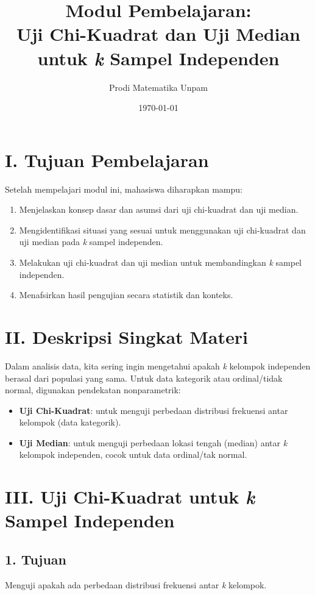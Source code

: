 \documentclass[12pt]{article}
\title{Modul Pembelajaran:\\Uji Chi-Kuadrat dan Uji Median untuk \textit{k} Sampel Independen}
\author{Prodi Matematika Unpam}
\date{\today}
\begin{document}
	
	\maketitle
	
	\section*{I. Tujuan Pembelajaran}
	Setelah mempelajari modul ini, mahasiswa diharapkan mampu:
	\begin{enumerate}
		\item Menjelaskan konsep dasar dan asumsi dari uji chi-kuadrat dan uji median.
		\item Mengidentifikasi situasi yang sesuai untuk menggunakan uji chi-kuadrat dan uji median pada \textit{k} sampel independen.
		\item Melakukan uji chi-kuadrat dan uji median untuk membandingkan \textit{k} sampel independen.
		\item Menafsirkan hasil pengujian secara statistik dan konteks.
	\end{enumerate}
	
	\section*{II. Deskripsi Singkat Materi}
	Dalam analisis data, kita sering ingin mengetahui apakah \textit{k} kelompok independen berasal dari populasi yang sama. Untuk data kategorik atau ordinal/tidak normal, digunakan pendekatan nonparametrik:
	
	\begin{itemize}
		\item \textbf{Uji Chi-Kuadrat}: untuk menguji perbedaan distribusi frekuensi antar kelompok (data kategorik).
		\item \textbf{Uji Median}: untuk menguji perbedaan lokasi tengah (median) antar \textit{k} kelompok independen, cocok untuk data ordinal/tak normal.
	\end{itemize}
	
	\section*{III. Uji Chi-Kuadrat untuk \textit{k} Sampel Independen}
	\subsection*{1. Tujuan}
	Menguji apakah ada perbedaan distribusi frekuensi antar \textit{k} kelompok.
	
\end{document}
